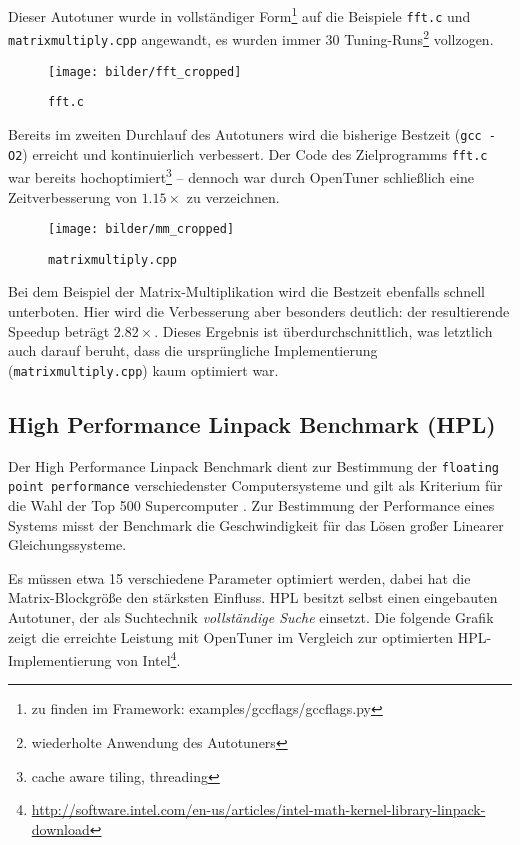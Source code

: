 \documentclass[a4paper,11pt]{scrartcl}
\begin{document}
Dieser Autotuner wurde in vollständiger Form\footnote{zu finden im Framework: 
examples/gccflags/gccflags.py} auf die Beispiele \texttt{fft.c} 
und \texttt{matrixmultiply.cpp} angewandt, es wurden immer 30 Tuning-Runs\footnote{wiederholte Anwendung 
des Autotuners} vollzogen.

\begin{figure}[h]
\begin{center}
\texttt{[image: bilder/fft\_cropped]}
\cite{OT-paper} \caption{\texttt{fft.c}}
\end{center}
\end{figure}

Bereits im zweiten Durchlauf des Autotuners wird die bisherige Bestzeit (\texttt{gcc -O2}) 
erreicht und kontinuierlich verbessert. Der Code des Zielprogramms \texttt{fft.c} war bereits
hochoptimiert\footnote{cache aware tiling, threading} -- dennoch war durch OpenTuner schließlich
eine Zeitverbesserung von $1.15 \times$  zu verzeichnen.

\begin{figure}[h]
\begin{center}
\texttt{[image: bilder/mm\_cropped]}
\cite{OT-paper} \caption{\texttt{matrixmultiply.cpp}}
\end{center}
\end{figure}

Bei dem Beispiel der Matrix-Multiplikation wird die Bestzeit ebenfalls schnell unterboten.
Hier wird die Verbesserung aber besonders deutlich: der resultierende Speedup beträgt
$2.82 \times$. Dieses Ergebnis ist überdurchschnittlich, was letztlich auch darauf beruht,
dass die ursprüngliche Implementierung (\texttt{matrixmultiply.cpp}) kaum optimiert war.

\subsection{High Performance Linpack Benchmark (HPL)}
Der High Performance Linpack Benchmark \cite{hpl} dient zur Bestimmung der 
\texttt{floating point performance} verschiedenster Computersysteme und gilt als 
Kriterium für die Wahl der Top 500 Supercomputer \cite{top500}.
Zur Bestimmung der Performance eines Systems misst der Benchmark die Geschwindigkeit 
für das Lösen großer Linearer Gleichungssysteme. \newline

Es müssen etwa 15 verschiedene Parameter
optimiert werden, dabei hat die Matrix-Blockgröße den stärksten Einfluss.
HPL besitzt selbst einen eingebauten Autotuner, der als Suchtechnik 
\emph{vollständige Suche} einsetzt. Die folgende Grafik zeigt die erreichte Leistung
mit OpenTuner im Vergleich zur optimierten HPL-Implementierung von Intel\footnote{\url{http://software.intel.com/en-us/articles/intel-math-kernel-library-linpack-download}}. \newline
\end{document}

